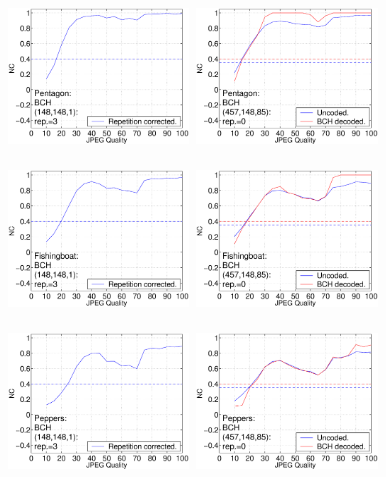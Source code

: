 \documentclass[12pt]{report}
\begin{document}
\begin{figure}[p]
\setlength{\abovecaptionskip}{-0.25cm}
\centerline{ \hbox{
\includegraphics[height=3.81cm,width=4.8cm]{EPS_BK_formattedBetter/ml148pent148.eps}
\includegraphics[height=3.81cm,width=4.8cm]{EPS_BK_formattedBetter/ml148pent457.eps}
}}
 
\centerline{ \hbox{
\includegraphics[height=3.81cm,width=4.8cm]{EPS_BK_formattedBetter/ml148fish148.eps}
\includegraphics[height=3.81cm,width=4.8cm]{EPS_BK_formattedBetter/ml148fish457.eps}
}}
 
\centerline{ \hbox{
\includegraphics[height=3.81cm,width=4.8cm]{EPS_BK_formattedBetter/ml148pep148.eps}
\includegraphics[height=3.81cm,width=4.8cm]{EPS_BK_formattedBetter/ml148pep457.eps}
}}


\end{figure}
\end{document}
